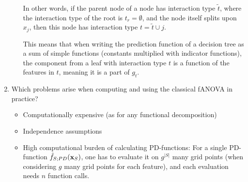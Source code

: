 \begin{enumerate}
\begin{itemize}
        In other words, if the parent node of a node has interaction type $\tilde{t}$, where the interaction type of the root is $t_r = \emptyset$, and the node itself splits upon $x_j$, then this node has interaction type $t = \tilde{t} \cup j$.

        This means that when writing the prediction function of a decision tree as a sum of simple functions (constants multiplied with indicator functions), the component from a leaf with interaction type $t$ is a function of the features in $t$, meaning it is a part of $g_t$.
    \end{itemize}
    \item \label{ex:fd_quiz_problems_of_std_fanova}
    Which problems arise when computing and using the classical fANOVA in practice?
    \begin{itemize}
            \item Computationally expensive (as for any functional decomposition)
            \item Independence assumptions
            \item High computational burden of calculating PD-functions: For a single PD-function $\hat{f}_{S;PD}(\mathbf{x}_S)$, one has to evaluate it on $g^{|S|}$ many grid points (when considering $g$ many grid points for each feature), and each evaluation needs $n$ function calls.


\end{itemize}
\end{enumerate}
